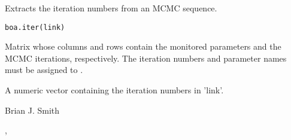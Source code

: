 \begin{Description}\relax
Extracts the iteration numbers from an MCMC sequence.
\end{Description}
\begin{Usage}
\begin{verbatim}
boa.iter(link)
\end{verbatim}
\end{Usage}
\begin{Arguments}
\begin{ldescription}
\item[\code{link}] Matrix whose columns and rows contain the monitored parameters 
and the MCMC iterations, respectively. The iteration numbers and parameter 
names must be assigned to .
\end{ldescription}
\end{Arguments}
\begin{Value}
A numeric vector containing the iteration numbers in 'link'.
\end{Value}
\begin{Author}\relax
Brian J. Smith
\end{Author}
\begin{SeeAlso}\relax
{}, 
\end{SeeAlso}

